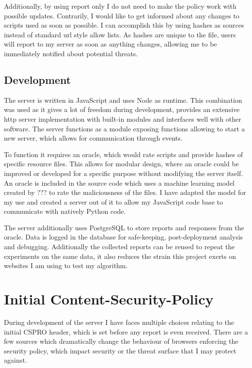 Additionally, by using report only I do not need to make the policy work with possible updates.
Contrarily, I would like to get informed about any changes to scripts used as soon as possible.
I can accomplish this by using hashes as sources instead of standard url style allow lists.
As hashes are unique to the file, users will report to my server as soon as anything changes, allowing me to be immediately notified about potential threats.

\subsection{Development}

The server is written in JavaScript and uses Node as runtime.
This combination was used as it gives a lot of freedom during development, provides an extensive http server implementation with built-in modules and interfaces well with other software.
The server functions as a module exposing functions allowing to start a new server, which allows for communication through events.

To function it requires an oracle, which would rate scripts and provide hashes of specific resource files.
This allows for modular design, where an oracle could be improved or developed for a specific purpose without modifying the server itself.
An oracle is included in the source code which uses a machine learning model created by ??? to rate the maliciousness of the files.
I have adapted the model for my use and created a server out of it to allow my JavaScript code base to communicate with natively Python code.

The server additionally uses PostgreSQL to store reports and responses from the oracle.
Data is logged in the database for safe-keeping, post-deployment analysis and debugging.
Additionally the collected reports can be reused to repeat the experiments on the same data, it also reduces the strain this project exerts on websites I am using to test my algorithm.


\section{Initial Content-Security-Policy}

During development of the server I have faces multiple choices relating to the initial CSPRO header, which is set before any report is even received.
There are a few sources which dramatically change the behaviour of browsers enforcing the security policy, which impact security or the threat surface that I may protect against.

